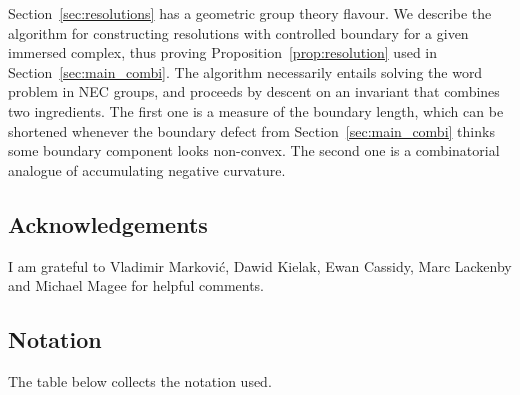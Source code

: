 \documentclass{amsart}
\begin{document}
Section~\ref{sec:resolutions} has a geometric group theory flavour. We describe the algorithm for constructing resolutions with controlled boundary for a given immersed complex, thus proving Proposition~\ref{prop:resolution} used in Section~\ref{sec:main_combi}. The algorithm necessarily entails solving the word problem in NEC groups, and proceeds by descent on an invariant that combines two ingredients. The first one is a measure of the boundary length, which can be shortened whenever the boundary defect from Section~\ref{sec:main_combi} thinks some boundary component looks non-convex. The second one is a combinatorial analogue of accumulating negative curvature.

\subsection*{Acknowledgements} I am grateful to Vladimir Markovi\'c, Dawid Kielak, Ewan Cassidy, Marc Lackenby and Michael Magee for helpful comments.

\subsection{Notation}

The table below collects the notation used.

\smallskip
\end{document}
